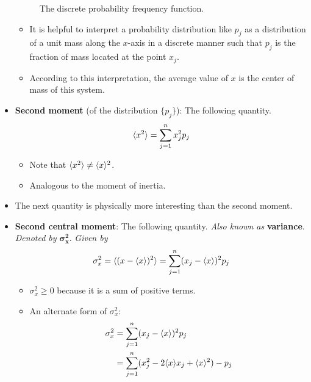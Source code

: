 \documentclass[../notes.tex]{subfiles}
\begin{document}
\begin{itemize}
\begin{figure}[h!]
        \caption{The discrete probability frequency function.}
        \label{fig:discreteProbabilityDensity}
    \end{figure}
    \begin{itemize}
        \item It is helpful to interpret a probability distribution like $p_j$ as a distribution of a unit mass along the $x$-axis in a discrete manner such that $p_j$ is the fraction of mass located at the point $x_j$.
        \item According to this interpretation, the average value of $x$ is the center of mass of this system.
    \end{itemize}
    \pagebreak
    \item \textbf{Second moment} (of the distribution $\{p_j\}$): The following quantity.
    \begin{equation*}
        \langle{x^2}\rangle = \sum_{j=1}^nx_j^2p_j
    \end{equation*}
    \begin{itemize}
        \item Note that $\langle{x^2}\rangle\neq\langle{x}\rangle^2$.
        \item Analogous to the moment of inertia.
    \end{itemize}
    \item The next quantity is physically more interesting than the second moment.
    \item \textbf{Second central moment}: The following quantity. \emph{Also known as} \textbf{variance}. \emph{Denoted by} $\bm{\sigma_x^2}$. \emph{Given by}
    \begin{equation*}
        \sigma_x^2 = \langle{(x-\langle{x}\rangle)^2}\rangle = \sum_{j=1}^n(x_j-\langle{x}\rangle)^2p_j
    \end{equation*}
    \begin{itemize}
        \item $\sigma_x^2\geq 0$ because it is a sum of positive terms.
        \item An alternate form of $\sigma_x^2$:
        \begin{align*}
            \sigma_x^2 &= \sum_{j=1}^n(x_j-\prb{x})^2p_j\\
            &= \sum_{j=1}^n(x_j^2-2\prb{x}x_j+\prb{x}^2)-p_j\\

\end{align*}
\end{itemize}
\end{itemize}
\end{document}
